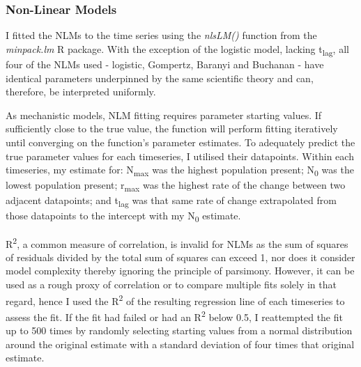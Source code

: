 \documentclass[11pt]{article}
\begin{document}
\subsubsection{Non-Linear Models}
I fitted the NLMs to the time series using the \textit{nlsLM()} function from the \textit{minpack.lm} R package. With the exception of the logistic model, lacking t\textsubscript{lag}, all four of the NLMs used - logistic, Gompertz, Baranyi and Buchanan - have identical parameters underpinned by the same scientific theory and can, therefore, be interpreted uniformly.\parencite{Odenbaugh2006}

As mechanistic models, NLM fitting requires parameter starting values. If sufficiently close to the true value, the function will perform fitting iteratively until converging on the function's parameter estimates. To adequately predict the true parameter values for each timeseries, I utilised their datapoints. Within each timeseries, my estimate for: N\textsubscript{max} was the highest population present; N\textsubscript{0} was the lowest population present; r\textsubscript{max} was the highest rate of the change between two adjacent datapoints; and t\textsubscript{lag} was that same rate of change extrapolated from those datapoints to the intercept with my N\textsubscript{0} estimate.\parencite{Micha2011}

R\textsuperscript{2}, a common measure of correlation, is invalid for NLMs as the sum of squares of residuals divided by the total sum of squares can exceed 1, nor does it consider model complexity thereby ignoring the principle of parsimony.\parencite{Johnson2004} However, it can be used as a rough proxy of correlation or to compare multiple fits solely in that regard, hence I used the R\textsuperscript{2} of the resulting regression line of each timeseries to assess the fit. If the fit had failed or had an R\textsuperscript{2} below 0.5, I reattempted the fit up to 500 times by randomly selecting starting values from a normal distribution around the original estimate with a standard deviation of four times that original estimate.
\end{document}
